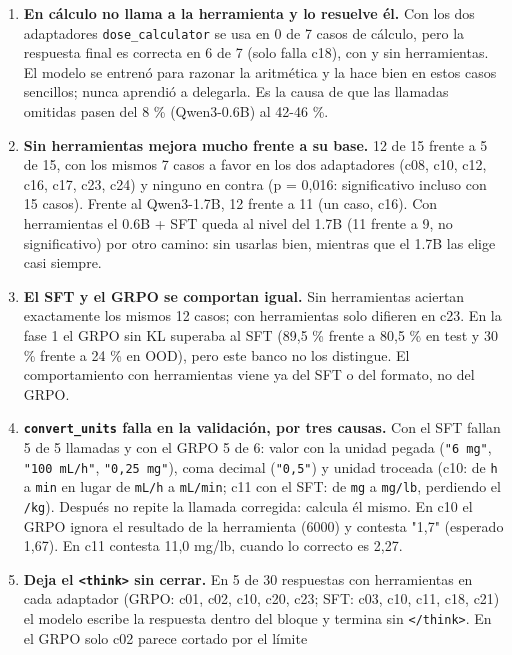 \begin{enumerate}
\tightlist
\item
  \textbf{En cálculo no llama a la herramienta y lo resuelve él.} Con los dos adaptadores \texttt{dose\_\allowbreak{}calculator}
  se usa en 0 de 7 casos de cálculo, pero la respuesta final es correcta en 6 de 7 (solo falla
  c18), con y sin herramientas. El modelo se entrenó para razonar la aritmética y la hace bien en
  estos casos sencillos; nunca aprendió a delegarla. Es la causa de que las llamadas omitidas
  pasen del 8 \% (Qwen3-0.6B) al 42-46 \%.
\item
  \textbf{Sin herramientas mejora mucho frente a su base.} 12 de 15 frente a 5 de 15, con los mismos 7
  casos a favor en los dos adaptadores (c08, c10, c12, c16, c17, c23, c24) y ninguno en contra
  (p = 0,016: significativo incluso con 15 casos). Frente al Qwen3-1.7B, 12 frente a 11
  (un caso, c16). Con herramientas el 0.6B + SFT queda al nivel del 1.7B (11 frente a 9, no
  significativo) por otro camino: sin usarlas bien, mientras que el 1.7B las elige casi siempre.
\item
  \textbf{El SFT y el GRPO se comportan igual.} Sin herramientas aciertan exactamente los mismos 12
  casos; con herramientas solo difieren en c23. En la fase 1 el GRPO sin KL superaba al SFT (89,5 \%
  frente a 80,5 \% en test y 30 \% frente a 24 \% en OOD), pero este banco no los distingue. El
  comportamiento con herramientas viene ya del SFT o del formato, no del GRPO.
\item
  \textbf{\texttt{convert\_\allowbreak{}units} falla en la validación, por tres causas.} Con el SFT fallan 5 de 5 llamadas
  y con el GRPO 5 de 6: valor con la unidad pegada (\texttt{"6 mg"}, \texttt{"100 mL/\allowbreak{}h"}, \texttt{"0,25 mg"}), coma
  decimal (\texttt{"0,5"}) y unidad troceada (c10: de \texttt{h} a \texttt{min} en lugar de \texttt{mL/\allowbreak{}h} a \texttt{mL/\allowbreak{}min}; c11
  con el SFT: de \texttt{mg} a \texttt{mg/\allowbreak{}lb}, perdiendo el \texttt{/\allowbreak{}kg}). Después no repite la llamada corregida:
  calcula él mismo. En c10 el GRPO ignora el resultado de la herramienta (6000) y contesta
  "1,7" (esperado 1,67). En c11 contesta 11,0 mg/lb, cuando lo correcto es 2,27.
\item
  \textbf{Deja el \texttt{\textless{}think\textgreater{}} sin cerrar.} En 5 de 30 respuestas con herramientas en cada adaptador
  (GRPO: c01, c02, c10, c20, c23; SFT: c03, c10, c11, c18, c21) el modelo escribe la respuesta
  dentro del bloque y termina sin \texttt{\textless{}/\allowbreak{}think\textgreater{}}. En el GRPO solo c02 parece cortado por el límite

\end{enumerate}
